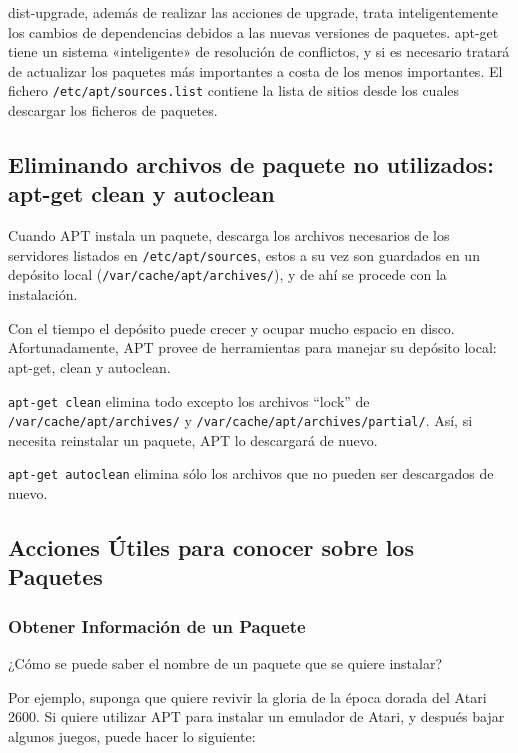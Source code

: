 \documentclass[12pt]{article}
\begin{document}
           dist-upgrade, además de realizar las acciones de upgrade, trata
           inteligentemente los cambios de dependencias debidos a las nuevas
           versiones de paquetes. apt-get tiene un sistema «inteligente» de
           resolución de conflictos, y si es necesario tratará de actualizar
           los paquetes más importantes a costa de los menos importantes. El
           fichero \texttt{/etc/apt/sources.list} contiene la lista de sitios desde los cuales descargar los ficheros de paquetes. 

\subsection*{Eliminando archivos de paquete no utilizados: apt-get clean y autoclean}

Cuando APT instala un paquete, descarga los archivos necesarios de los servidores listados en \texttt{/etc/apt/sources}, estos a su vez son guardados en un depósito local (\texttt{/var/cache/apt/archives/}), y de ahí se procede con la instalación.

Con el tiempo el depósito puede crecer y ocupar mucho espacio en disco. Afortunadamente, APT provee de herramientas para manejar su depósito local: apt-get, clean y autoclean.

\texttt{apt-get clean} elimina todo excepto los archivos ``lock'' de \texttt{/var/cache/apt/archives/} y \texttt{/var/cache/apt/archives/partial/}. Así, si necesita reinstalar un paquete, APT lo descargará de nuevo.

\texttt{apt-get autoclean} elimina sólo los archivos que no pueden ser descargados de nuevo.

\subsection*{Acciones Útiles para conocer sobre los Paquetes}
\subsubsection*{Obtener Información de un Paquete}

 ¿Cómo se puede saber el nombre de un paquete que se quiere instalar?

Por ejemplo, suponga que quiere revivir la gloria de la época dorada del Atari 2600. Si quiere utilizar APT para instalar un emulador de Atari, y después bajar algunos juegos, puede hacer lo siguiente:
\end{document}
